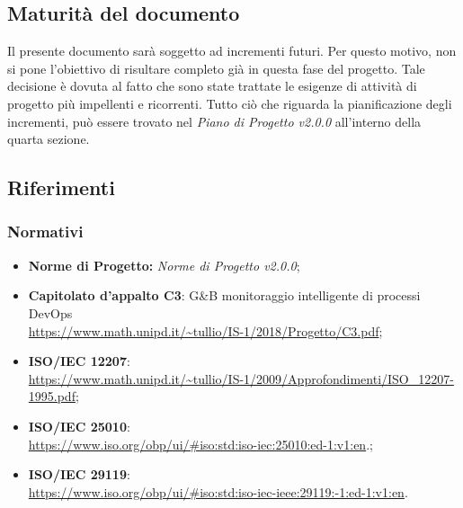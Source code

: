 \subsection{Maturità del documento}
Il presente documento sarà soggetto ad incrementi futuri. Per questo motivo, non si pone l'obiettivo di risultare completo già in questa fase del progetto.
Tale decisione è dovuta al fatto che sono state trattate le esigenze di attività di progetto più impellenti e ricorrenti.
Tutto ciò che riguarda la pianificazione degli incrementi, può essere trovato nel \emph{Piano di Progetto v2.0.0} all'interno della quarta sezione.
\subsection{Riferimenti}

\subsubsection{Normativi}
\begin{itemize}
	\item \textbf{Norme di Progetto:} \emph{Norme di Progetto v2.0.0};
	\item \textbf{Capitolato d'appalto C3}: G\&B monitoraggio intelligente di processi DevOps \\
	\url{https://www.math.unipd.it/~tullio/IS-1/2018/Progetto/C3.pdf};
	\item \textbf{ISO/IEC 12207}:\\ \url{https://www.math.unipd.it/~tullio/IS-1/2009/Approfondimenti/ISO_12207-1995.pdf};
	\item \textbf{ISO/IEC 25010}:\\ \url{https://www.iso.org/obp/ui/#iso:std:iso-iec:25010:ed-1:v1:en}.;
	\item \textbf{ISO/IEC 29119}:\\ \url{https://www.iso.org/obp/ui/#iso:std:iso-iec-ieee:29119:-1:ed-1:v1:en}.

\end{itemize}
